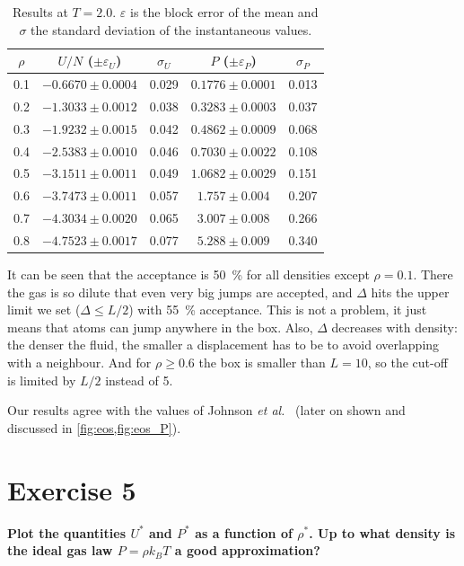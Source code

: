 \documentclass[a4paper,11pt]{article}
\newcommand{\exercise}[1]{\section*{Exercise #1}\addcontentsline{toc}{section}{Exercise #1}}
\newcommand{\statement}[1]{\textbf{#1}\par}
\begin{document}
\begin{table}[H]
  \centering
  \caption{Results at $T=2.0$. $\varepsilon$ is the block error of the mean and $\sigma$ the
  standard deviation of the instantaneous values.}
  \label{tab:results}
  \begin{tabular}{S[table-format=1.1] c S[table-format=1.3] c S[table-format=1.3]}
    \toprule
    {$\rho$} & $U/N$ ($\pm\varepsilon_U$) & {$\sigma_U$} & $P$ ($\pm\varepsilon_P$) & {$\sigma_P$} \\
     & $-0.6670 \pm 0.0004$ & 0.029 & $0.1776 \pm 0.0001$ & 0.013 \\
    0.2 & $-1.3033 \pm 0.0012$ & 0.038 & $0.3283 \pm 0.0003$ & 0.037 \\
    0.3 & $-1.9232 \pm 0.0015$ & 0.042 & $0.4862 \pm 0.0009$ & 0.068 \\
    0.4 & $-2.5383 \pm 0.0010$ & 0.046 & $0.7030 \pm 0.0022$ & 0.108 \\
    0.5 & $-3.1511 \pm 0.0011$ & 0.049 & $1.0682 \pm 0.0029$ & 0.151 \\
    0.6 & $-3.7473 \pm 0.0011$ & 0.057 & $1.757 \pm 0.004$   & 0.207 \\
    0.7 & $-4.3034 \pm 0.0020$ & 0.065 & $3.007 \pm 0.008$   & 0.266 \\
    0.8 & $-4.7523 \pm 0.0017$ & 0.077 & $5.288 \pm 0.009$   & 0.340 \\
    \bottomrule
  \end{tabular}
\end{table}

It can be seen that the acceptance is \SI{50}{\percent} for all densities except $\rho=0.1$. There the gas is so
dilute that even very big jumps are accepted, and $\Delta$ hits the upper limit we set
($\Delta\le L/2$) with \SI{55}{\percent} acceptance. This is not a problem, it just means
that atoms can jump anywhere in the box. Also, $\Delta$ decreases with density: the denser the fluid, the smaller a displacement has to be
to avoid overlapping with a neighbour. And for $\rho\ge0.6$ the box is smaller than $L=10$, so the cut-off is limited by $L/2$ instead of 5.

Our results agree with the values of Johnson \emph{et al.}\ \cite{johnson} (later on shown and discussed in
\cref{fig:eos,fig:eos_P}).

\exercise{5}
\statement{Plot the quantities $U^*$ and $P^*$ as a function of $\rho^*$. Up to what density is the
ideal gas law $P=\rho k_BT$ a good approximation?}
\end{document}
